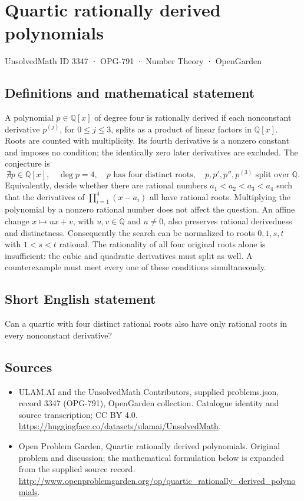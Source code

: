 \documentclass[11pt,a4paper]{article}
\begin{document}
\section*{Quartic rationally derived polynomials}\label{3347}
{\small UnsolvedMath ID 3347 · OPG-791 · Number Theory · OpenGarden}
\subsection{Definitions and mathematical statement}
A polynomial $p\in\mathbb Q[x]$ of degree four is rationally derived if
each nonconstant derivative $p^{(j)}$, for $0\le j\le3$, splits as a
product of linear factors in $\mathbb Q[x]$. Roots are counted with
multiplicity. Its fourth derivative is a nonzero constant and imposes
no condition; the identically zero later derivatives are excluded.
The conjecture is
\[
 \nexists p\in\mathbb Q[x],\quad \deg p=4,
 \quad p\text{ has four distinct roots},
 \quad p,p',p'',p^{(3)}\text{ split over }\mathbb Q.
\]
Equivalently, decide whether there are rational numbers
$a_1<a_2<a_3<a_4$ such that the derivatives of
$\prod_{i=1}^4(x-a_i)$ all have rational roots. Multiplying the
polynomial by a nonzero rational number does not affect the question.
An affine change $x\mapsto ux+v$, with $u,v\in\mathbb Q$ and $u\ne0$,
also preserves rational derivedness and distinctness. Consequently the
search can be normalized to roots $0,1,s,t$ with $1<s<t$ rational.
The rationality of all four original roots alone is insufficient:
the cubic and quadratic derivatives must split as well. A counterexample
must meet every one of these conditions simultaneously.
\subsection{Short English statement}
Can a quartic with four distinct rational roots also have only rational roots in every nonconstant derivative?
\subsection{Sources}
\begin{itemize}
\item[S1] ULAM.AI and the UnsolvedMath Contributors, supplied problems.json, record 3347 (OPG-791), OpenGarden collection. Catalogue identity and source transcription; CC BY 4.0.
\url{https://huggingface.co/datasets/ulamai/UnsolvedMath}.
\item[S2] Open Problem Garden, Quartic rationally derived polynomials. Original problem and discussion; the mathematical formulation below is expanded from the supplied source record.
\url{http://www.openproblemgarden.org/op/quartic_rationally_derived_polynomials}.
\end{itemize}
\end{document}
